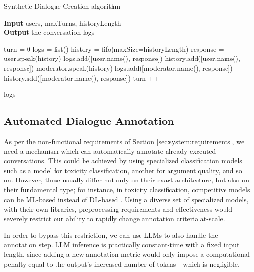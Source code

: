 \begin{algorithm}
	\caption{Synthetic Dialogue Creation algorithm} 
	\label{al::dialogue-creation}
	\hspace*{\algorithmicindent} \textbf{Input} users, maxTurns, historyLength\\
	\hspace*{\algorithmicindent} \textbf{Output} the conversation logs
	\begin{algorithmic}[1]	
		\State turn = 0
		\State logs = list()
		\State history = fifo(maxSize=historyLength)
		\State 
		\State response = user.speak(history)
		\State logs.add([user.name(), response])
		\State history.add([user.name(), response])
		\State
		\State moderator.speak(history)
		\State logs.add([moderator.name(), response])
		\State history.add([moderator.name(), response])
		\EndFor
		\State turn ++
		\EndWhile
		
		\State \Return logs
		
	\end{algorithmic} 
\end{algorithm}



\subsection{Automated Dialogue Annotation}
\label{ssec:system:annotation}

As per the non-functional requirements of Section \ref{sec:system:requirements}, we need a mechanism which can automatically annotate already-executed conversations. This could be achieved by using specialized classification models such as a model for toxicity classification, another for argument quality, and so on. However, these usually differ not only on their exact architecture, but also on their fundamental type; for instance, in toxicity classification, competitive models can be \ac{ML}-based instead of \ac{DL}-based \cite{anjum2024hate}. Using a diverse set of specialized models, with their own libraries, preprocessing requirements and effectiveness would severely restrict our ability to rapidly change annotation criteria at-scale. 

In order to bypass this restriction, we can use LLMs to also handle the annotation step. LLM inference is practically constant-time with a fixed input length, since adding a new annotation metric would only impose a computational penalty equal to the output's increased number of tokens - which is negligible. 

